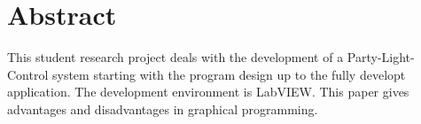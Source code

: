 \thispagestyle{empty}
\label{chap:Abstract}
\section*{Abstract}

This student research project deals with the development of a Party-Light-Control system starting with the program design up to the fully developt application. 
The development environment is LabVIEW. This paper gives advantages and disadvantages in graphical programming.


